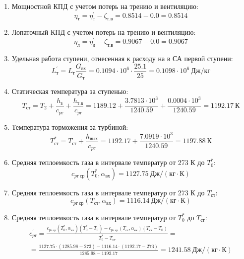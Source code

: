 \documentclass[a4paper,10pt]{article}
\begin{document}
\begin{enumerate}
        \item Мощностной КПД с учетом потерь на трению и вентиляцию:
        \[
            \eta_т = \eta_т^\prime - \zeta_{т.в} =
                0.8514 - 0.0 =
            0.8514
        \]

        \item Лопаточный КПД с учетом потерь на трению и вентиляцию:
        \[
            \eta_л = \eta_л^\prime - \zeta_{т.в} =
                0.9067 - 0.0 =
            0.9067
        \]

        

        \item Удельная работа ступени, отнесенная к расходу на в СА первой ступени:
        \[
            L_т^\prime = L_т \frac{ G_{вх} }{ G_т }  =
                0.1094 \cdot 10^6 \cdot
                \frac{ 25.1 }{ 25 } =
            0.1098 \cdot 10^6 \ Дж/кг
        \]

        \item Статическая температура за ступенью:
        \[
            T_{ст} = T_2 + \frac{ h_з }{ c_{pг} } + \frac{ h_{т.в} }{ c_{pг} } =
                1189.12 +
                \frac{3.7813 \cdot 10^3 }{ 1240.59 } +
                \frac{ 0.0004 \cdot 10^3 }{ 1240.59 } =
            1192.17 \ К
        \]

        \item Температура торможения за турбиной:
        \[
            T_{ст}^* = T_{ст} + \frac{ h_{вых} }{ c_{pг} } =
                1192.17 +
                \frac{ 7.0919 \cdot 10^3 }{ 1240.59 } =
            1197.88 \ К
        \]

        \item Средняя теплоемкость газа в интервале температур от 273 К до $T_0^*$:
        \[
            c_{pг\ ср} (T_0^*, \alpha_{вх}) =
            1127.75 \ Дж/(кг \cdot К)
        \]

        \item Средняя теплоемкость газа в интервале температур от 273 К до $T_{ст}$:
        \[
            c_{pг\ ср} (T_{ст}, \alpha_{вх}) =
            1116.14 \ Дж/(кг \cdot К)
        \]

        \item Средняя теплоемкость газа в интервале температур от $T_0^*$ до $T_{ст}$:
        \begin{gather*}
            c_{pг}^\prime = \frac{
		        c_{pг\ ср} (T_0^*, \alpha_{вх}) (T_0^* - T_0) - c_{pг\ ср} (T_{ст}, \alpha_{вх})(T_{ст} - T_0)
		    }{
		        T_0^* - T_{ст}} =\\
            =\frac{
		        1127.75 \cdot
                (1285.98 - 273) -
		        1116.14 \cdot
                (1192.17 - 273)
		    }{
		        1285.98 - 1192.17} =
		    1241.58 \ Дж / (кг \cdot К)\\
        \end{gather*}


\end{enumerate}
\end{document}
